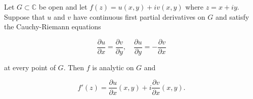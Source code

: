 Let $G \subset \mathbb{C}$ be open and let $f(z) = u(x, y) + i v(x, y)$ where $z = x + iy$. Suppose that $u$ and $v$ have continuous first partial derivatives on $G$ and satisfy the Cauchy-Riemann equations

$$\frac{\partial u}{\partial x} = \frac{\partial v}{\partial y}, \quad \frac{\partial u}{\partial y} = -\frac{\partial v}{\partial x}$$

at every point of $G$. Then $f$ is analytic on $G$ and

$$f'(z) = \frac{\partial u}{\partial x}(x, y) + i \frac{\partial v}{\partial x}(x, y).$$

